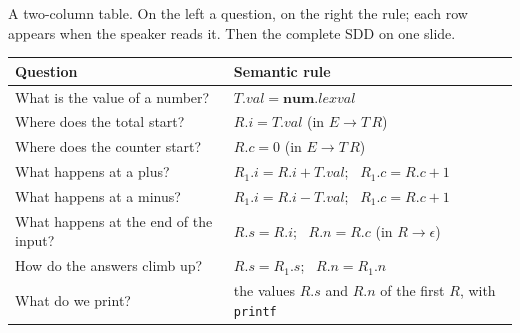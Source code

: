 \documentclass[11pt,a4paper]{article}
\newcommand{\at}[2]{\ensuremath{#1.\mathit{#2}}}
\begin{document}
\begin{onscreen}
A two-column table. On the left a question, on the right the rule; each row appears when the speaker reads it. Then the complete SDD on one slide.
\begin{center}
\small
\begin{tabular}{@{}p{5.7cm} p{7.4cm}@{}}
\toprule
\textbf{Question} & \textbf{Semantic rule} \\ \midrule
What is the value of a number? & $\at{T}{val}=\at{\mathbf{num}}{lexval}$ \\
Where does the total start? & $\at{R}{i}=\at{T}{val}$ \hfill (in $E\to T\,R$) \\
Where does the counter start? & $\at{R}{c}=0$ \hfill (in $E\to T\,R$) \\
What happens at a plus? & $\at{R_1}{i}=\at{R}{i}+\at{T}{val}$; \ $\at{R_1}{c}=\at{R}{c}+1$ \\
What happens at a minus? & $\at{R_1}{i}=\at{R}{i}-\at{T}{val}$; \ $\at{R_1}{c}=\at{R}{c}+1$ \\
What happens at the end of the input? & $\at{R}{s}=\at{R}{i}$; \ $\at{R}{n}=\at{R}{c}$ \hfill (in $R\to\epsilon$) \\
How do the answers climb up? & $\at{R}{s}=\at{R_1}{s}$; \ $\at{R}{n}=\at{R_1}{n}$ \\
What do we print? & the values $\at{R}{s}$ and $\at{R}{n}$ of the first $R$, with \texttt{printf} \\ \bottomrule
\end{tabular}
\end{center}
\end{onscreen}
\end{document}
